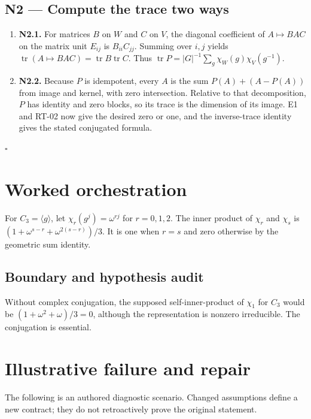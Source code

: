 \documentclass[preprint,12pt,aps,pra,showkeys,amsmath,amssymb,superscriptaddress,floatfix]{revtex4-2}
\theoremstyle{definition}
\theoremstyle{remark}
\begin{document}
\subsection{N2 --- Compute the trace two
ways}\label{n2-compute-the-trace-two-ways}

\begin{enumerate}
\def\labelenumi{\arabic{enumi}.}
\item
  \textbf{N2.1.} For matrices \(B\) on \(W\) and \(C\) on \(V\), the
  diagonal coefficient of \(A\mapsto BAC\) on the matrix unit \(E_{ij}\)
  is \(B_{ii}C_{jj}\). Summing over \(i,j\) yields
  \(\operatorname{tr}(A\mapsto BAC)=\operatorname{tr}B\operatorname{tr}C\).
  Thus \(\operatorname{tr}P=|G|^{-1}\sum_g\chi_W(g)\chi_V(g^{-1})\).
\item
  \textbf{N2.2.} Because \(P\) is idempotent, every \(A\) is the sum
  \(P(A)+(A-P(A))\) from image and kernel, with zero intersection.
  Relative to that decomposition, \(P\) has identity and zero blocks, so
  its trace is the dimension of its image. E1 and RT-02 now give the
  desired zero or one, and the inverse-trace identity gives the stated
  conjugated formula.
\end{enumerate}

\hfill$\square$

\section{Worked orchestration}

For \(C_3=\langle g\rangle\), let \(\chi_r(g^j)=\omega^{rj}\) for
\(r=0,1,2\). The inner product of \(\chi_r\) and \(\chi_s\) is
\((1+\omega^{s-r}+\omega^{2(s-r)})/3\). It is one when \(r=s\) and zero
otherwise by the geometric sum identity.

\subsection{Boundary and hypothesis audit}

Without complex conjugation, the supposed self-inner-product of
\(\chi_1\) for \(C_3\) would be \((1+\omega^2+\omega)/3=0\), although
the representation is nonzero irreducible. The conjugation is essential.

\section{Illustrative failure and repair}

The following is an authored diagnostic scenario. Changed assumptions
define a new contract; they do not retroactively prove the original
statement.
\end{document}
